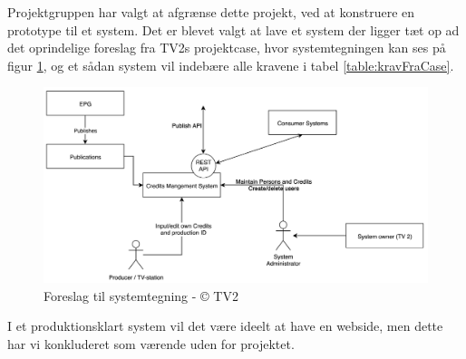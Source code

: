 \noindent 
Projektgruppen har valgt at afgrænse dette projekt, ved at konstruere en prototype til et system. Det er blevet valgt at lave et system der ligger tæt op ad det oprindelige foreslag fra TV2s projektcase, hvor systemtegningen kan ses på figur \ref{fig:tv2_system}, og et sådan system vil indebære alle kravene i tabel \ref{table:kravFraCase}.
\begin{figure}[H]
    \centering
    \includegraphics[scale=0.4]{figures/tv2_system.png}
    \caption{Foreslag til systemtegning - © TV2}
    \label{fig:tv2_system}
\end{figure}

\noindent %
I et produktionsklart system vil det være ideelt at have en webside, men dette har vi konkluderet som værende uden for projektet.